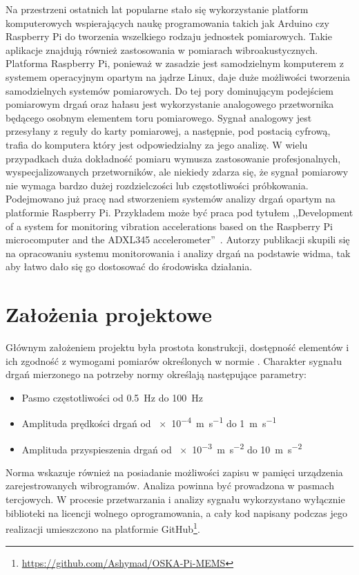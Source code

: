 \documentclass[a4paper,12pt]{mwart}
\let\Oldsection\section
\renewcommand{\section}{\FloatBarrier\Oldsection}
\begin{document}
Na przestrzeni ostatnich lat popularne stało się wykorzystanie platform
komputerowych wspierających naukę programowania takich jak Arduino czy Raspberry
Pi do tworzenia wszelkiego rodzaju jednostek pomiarowych. Takie aplikacje
znajdują również zastosowania w pomiarach wibroakustycznych. Platforma Raspberry
Pi, ponieważ w zasadzie jest samodzielnym komputerem z systemem operacyjnym
opartym na jądrze Linux, daje duże możliwości tworzenia samodzielnych systemów
pomiarowych. Do tej pory dominującym podejściem pomiarowym drgań oraz hałasu
jest wykorzystanie analogowego przetwornika będącego osobnym elementem toru
pomiarowego. Sygnał analogowy jest przesyłany z reguły do karty pomiarowej, a
następnie, pod postacią cyfrową, trafia do komputera który jest odpowiedzialny
za jego analizę. W wielu przypadkach duża dokładność pomiaru wymusza
zastosowanie profesjonalnych, wyspecjalizowanych przetworników, ale niekiedy
zdarza się, że sygnał pomiarowy nie wymaga bardzo dużej rozdzielczości lub
częstotliwości próbkowania. Podejmowano już pracę nad stworzeniem systemów
analizy drgań opartym na platformie Raspberry Pi. Przykładem może być praca pod
tytułem ,,Development of a system for monitoring vibration accelerations based
on the Raspberry Pi microcomputer and the ADXL345 accelerometer''~\cite{art1}.
Autorzy publikacji skupili się na opracowaniu systemu monitorowania i analizy
drgań na podstawie widma, tak aby łatwo dało się go dostosować do środowiska
działania. 

\section{Założenia projektowe}

Głównym założeniem projektu była prostota konstrukcji, dostępność elementów i
ich zgodność z wymogami pomiarów określonych w normie \cite{norma}. Charakter
sygnału drgań mierzonego na potrzeby normy określają następujące parametry:
\begin{itemize}
  \item Pasmo częstotliwości od \SI{0,5}{\hertz} do \SI{100}{\hertz}
  \item Amplituda prędkości drgań od \SI{e-4}{\metre\per\second} do \SI{1}{\metre\per\second}
  \item Amplituda przyspieszenia drgań od \SI{e-3}{\metre\per\square\second} do \SI{10}{\metre\per\square\second}
\end{itemize}
Norma wskazuje również na posiadanie możliwości zapisu w pamięci urządzenia
zarejestrowanych wibrogramów. Analiza powinna być prowadzona w pasmach
tercjowych. W procesie przetwarzania i analizy sygnału wykorzystano wyłącznie
biblioteki na licencji wolnego oprogramowania, a cały kod napisany podczas jego
realizacji umieszczono na platformie
GitHub\footnote{\url{https://github.com/Ashymad/OSKA-Pi-MEMS}}.
\end{document}
